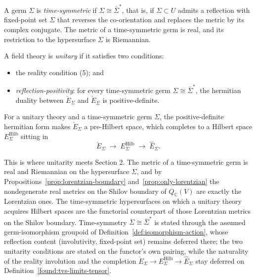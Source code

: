 \begin{definition}
  \label{def:unitarity}
  \notready
  A germ $\Sigma$ is \emph{time-symmetric} if $\Sigma \cong \bar\Sigma^*$, that
  is, if $\Sigma \subset U$ admits a reflection with fixed-point set $\Sigma$
  that reverses the co-orientation and replaces the metric by its complex
  conjugate. The metric of a time-symmetric germ is real, and its restriction to
  the hypersurface $\Sigma$ is Riemannian.

  A field theory is \emph{unitary} if it satisfies two conditions:
  \begin{itemize}
    \item[(i)] the reality condition (5); and
    \item[(ii)] \emph{reflection-positivity}: for every time-symmetric germ
      $\Sigma \cong \bar\Sigma^*$, the hermitian duality between
      $\check E_{\Sigma}$ and $\check E_{\bar\Sigma}$ is positive-definite.
  \end{itemize}

  For a unitary theory and a time-symmetric germ $\Sigma$, the positive-definite
  hermitian form makes $\check E_{\Sigma}$ a pre-Hilbert space, which completes
  to a Hilbert space $E^{\mathrm{Hilb}}_{\Sigma}$ sitting in
  \[
    \check E_{\Sigma} \;\longrightarrow\; E^{\mathrm{Hilb}}_{\Sigma}
    \;\longrightarrow\; \hat E_{\Sigma}.
  \]

  This is where unitarity meets Section 2. The metric of a time-symmetric germ is
  real and Riemannian on the hypersurface $\Sigma$, and by
  Propositions~\ref{prop:lorentzian-boundary} and~\ref{prop:only-lorentzian} the
  nondegenerate real metrics on the Shilov boundary of $Q_{\mathbb C}(V)$ are
  exactly the Lorentzian ones. The time-symmetric hypersurfaces on which a
  unitary theory acquires Hilbert spaces are the functorial counterpart of those
  Lorentzian metrics on the Shilov boundary. Time-symmetry
  $\Sigma \cong \bar\Sigma^*$ is stated through the assumed germ-isomorphism
  groupoid of Definition~\ref{def:isomorphism-action}, whose reflection content
  (involutivity, fixed-point set) remains deferred there; the two unitarity
  conditions are stated on the functor's own pairing, while the naturality of
  the reality involution and the completion
  $\check E_\Sigma \to E^{\mathrm{Hilb}}_\Sigma \to \hat E_\Sigma$ stay deferred
  on Definition~\ref{found:tvs-limits-tensor}.
\end{definition}
